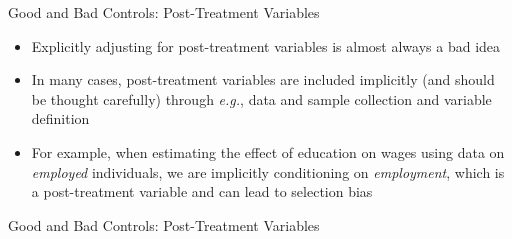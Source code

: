 \documentclass[aspectratio=1610,12pt,xcolor=dvipsnames]{beamer}
\begin{document}
\begin{frame}{Good and Bad Controls: Post-Treatment Variables}

\begin{itemize}
    \item Explicitly adjusting for post-treatment variables is almost always a bad idea
    \item In many cases, post-treatment variables are included implicitly (and should be thought carefully) through \textit{e.g.}, data and sample collection and variable definition
    \item For example, when estimating the effect of education on wages using data on \textit{employed} individuals, we are implicitly conditioning on \textit{employment}, which is a post-treatment variable and can lead to selection bias
\end{itemize}
\end{frame}

\begin{frame}{Good and Bad Controls: Post-Treatment Variables}

\end{frame}
\end{document}
